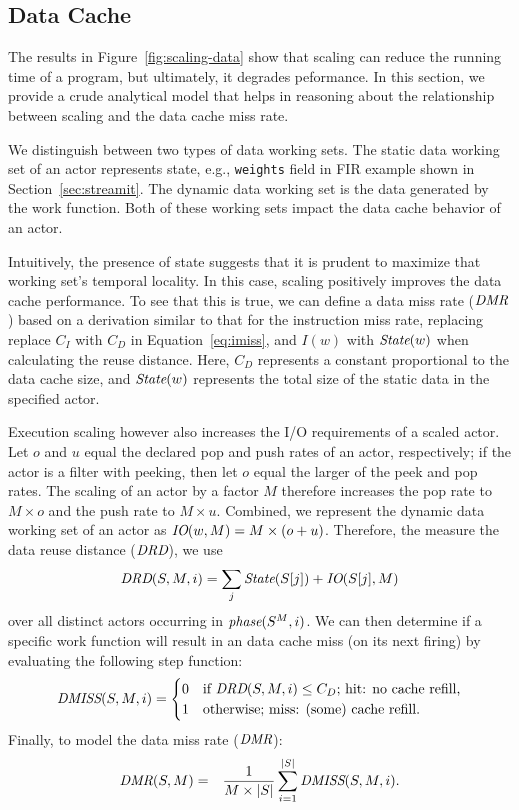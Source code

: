 \subsection{Data Cache}

The results in Figure~\ref{fig:scaling-data} show that scaling can
reduce the running time of a program, but ultimately, it degrades
peformance. In this section, we provide a crude analytical model that
helps in reasoning about the relationship between scaling and the data
cache miss rate. 

We distinguish between two types of data working sets. The static data
working set of an actor represents state, e.g., \texttt{weights}
field in FIR example shown in Section~\ref{sec:streamit}.
The dynamic data working set is the data generated by
the work function. Both of these working sets impact the data cache
behavior of an actor.

Intuitively, the presence of state suggests that it is
prudent to maximize that working set's temporal locality. In this
case, scaling positively improves the data cache performance. To see
that this is true, we can define a data miss rate ($\mbox{\it DMR}$) based on
a derivation similar to that for the instruction miss rate, replacing
replace $C_I$ with $C_D$ in Equation~\ref{eq:imiss}, and $I(w)$ with
$\mbox{\it State}(w)$ when calculating the reuse distance. Here, $C_D$
represents a constant proportional to the data cache size, and
$\mbox{\it State}(w)$ represents the total size of the static data in the
specified actor. 

Execution scaling however also increases the I/O requirements of a
scaled actor. Let $o$ and $u$ equal the declared pop and push rates
of an actor, respectively; if the actor is a filter with peeking, then
let $o$ equal the larger of the peek and pop rates. The scaling of an
actor by a factor $M$ therefore increases the pop rate to $M\times o$
and the push rate to $M\times u$. Combined, we represent the dynamic
data working set of an actor as $\mbox{\it IO}(w, M) =
M\times(o+u)$. Therefore, the measure the data reuse distance
($\mbox{\it DRD}$), we use
\[
  \mbox{\it DRD}(S,M,i)=\sum_{j} \mbox{\it State}(S[j]) + \mbox{\it IO}(S[j],M)
\]
over all distinct actors occurring in $\mbox{\it phase}(S^M,i)$.
We can then determine if a specific work function will
result in an data cache miss (on its next firing) by evaluating
the following step function:
\begin{equation}
\label{eq:dmiss}
  \mbox{\it DMISS}(S,M,i) =
    \begin{cases}
      0& \text{if $\mbox{\it DRD}(S,M,i) \leq C_D$; hit: no cache refill,}\\
      1& \text{otherwise; miss: (some) cache refill.}
    \end{cases}
\end{equation}
Finally, to model the data miss rate ($\mbox{\it DMR}$):
\begin{eqnarray}
  \label{eq:dmrM}
  \mbox{\it DMR}(S, M) &=& \frac{1}{M \times |S|}\sum_{i=1}^{|S|} \mbox{\it DMISS}(S,M,i).
\end{eqnarray}


